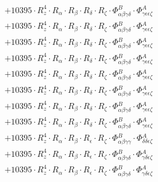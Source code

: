 \documentclass{article}
\begin{document}
\begin{subequations}
\begin{gather}
\begin{array}{c}
 \\[0.2em] 		 + 10395 \cdot R_{z}^{4} \cdot R_{\alpha{}} \cdot R_{\beta{}} \cdot R_{\delta{}} \cdot R_{\zeta{}} \cdot \Phi{}^{B}_{\alpha{}\beta{}\gamma{}\delta{}} \cdot \Phi{}^{A}_{\gamma{}\epsilon{}\epsilon{}\zeta{}} 
 \\[0.2em] 		 + 10395 \cdot R_{z}^{4} \cdot R_{\alpha{}} \cdot R_{\beta{}} \cdot R_{\delta{}} \cdot R_{\zeta{}} \cdot \Phi{}^{B}_{\alpha{}\beta{}\gamma{}\delta{}} \cdot \Phi{}^{A}_{\gamma{}\epsilon{}\epsilon{}\zeta{}} 
 \\[0.2em] 		 + 10395 \cdot R_{z}^{4} \cdot R_{\alpha{}} \cdot R_{\beta{}} \cdot R_{\delta{}} \cdot R_{\zeta{}} \cdot \Phi{}^{B}_{\alpha{}\beta{}\gamma{}\delta{}} \cdot \Phi{}^{A}_{\gamma{}\epsilon{}\epsilon{}\zeta{}} 
 \\[0.2em] 		 + 10395 \cdot R_{z}^{4} \cdot R_{\alpha{}} \cdot R_{\beta{}} \cdot R_{\delta{}} \cdot R_{\zeta{}} \cdot \Phi{}^{B}_{\alpha{}\beta{}\gamma{}\delta{}} \cdot \Phi{}^{A}_{\gamma{}\epsilon{}\epsilon{}\zeta{}} 
 \\[0.2em] 		 + 10395 \cdot R_{z}^{4} \cdot R_{\alpha{}} \cdot R_{\beta{}} \cdot R_{\delta{}} \cdot R_{\zeta{}} \cdot \Phi{}^{B}_{\alpha{}\beta{}\gamma{}\delta{}} \cdot \Phi{}^{A}_{\gamma{}\epsilon{}\epsilon{}\zeta{}} 
 \\[0.2em] 		 + 10395 \cdot R_{z}^{4} \cdot R_{\alpha{}} \cdot R_{\beta{}} \cdot R_{\delta{}} \cdot R_{\zeta{}} \cdot \Phi{}^{B}_{\alpha{}\beta{}\gamma{}\delta{}} \cdot \Phi{}^{A}_{\gamma{}\epsilon{}\epsilon{}\zeta{}} 
 \\[0.2em] 		 + 10395 \cdot R_{z}^{4} \cdot R_{\alpha{}} \cdot R_{\beta{}} \cdot R_{\delta{}} \cdot R_{\zeta{}} \cdot \Phi{}^{B}_{\alpha{}\beta{}\gamma{}\delta{}} \cdot \Phi{}^{A}_{\gamma{}\epsilon{}\epsilon{}\zeta{}} 
 \\[0.2em] 		 + 10395 \cdot R_{z}^{4} \cdot R_{\alpha{}} \cdot R_{\beta{}} \cdot R_{\delta{}} \cdot R_{\zeta{}} \cdot \Phi{}^{B}_{\alpha{}\beta{}\gamma{}\delta{}} \cdot \Phi{}^{A}_{\gamma{}\epsilon{}\epsilon{}\zeta{}} 
 \\[0.2em] 		 + 10395 \cdot R_{z}^{4} \cdot R_{\alpha{}} \cdot R_{\beta{}} \cdot R_{\epsilon{}} \cdot R_{\zeta{}} \cdot \Phi{}^{B}_{\alpha{}\beta{}\gamma{}\gamma{}} \cdot \Phi{}^{A}_{\delta{}\delta{}\epsilon{}\zeta{}} 
 \\[0.2em] 		 + 10395 \cdot R_{z}^{4} \cdot R_{\alpha{}} \cdot R_{\beta{}} \cdot R_{\epsilon{}} \cdot R_{\zeta{}} \cdot \Phi{}^{B}_{\alpha{}\beta{}\gamma{}\delta{}} \cdot \Phi{}^{A}_{\gamma{}\delta{}\epsilon{}\zeta{}} 
 \\[0.2em] 		 + 10395 \cdot R_{z}^{4} \cdot R_{\alpha{}} \cdot R_{\beta{}} \cdot R_{\epsilon{}} \cdot R_{\zeta{}} \cdot \Phi{}^{B}_{\alpha{}\beta{}\gamma{}\delta{}} \cdot \Phi{}^{A}_{\gamma{}\delta{}\epsilon{}\zeta{}} 

\end{array}
\end{gather}
\end{subequations}
\end{document}
